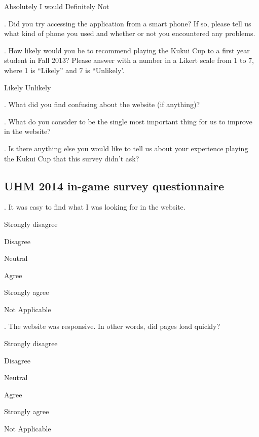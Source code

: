 \indent \indent Absolutely I would               \indent  Definitely Not

. Did you try accessing the application from a smart phone? If so, please tell us what kind of phone you used and whether or not you encountered any problems.

. How likely would you be to recommend playing the Kukui Cup to a first year student in Fall 2013?
Please answer with a number in a Likert scale from 1 to 7, where 1 is ``Likely'' and 7 is ``Unlikely'.

\indent \indent Likely               \indent  Unlikely

. What did you find confusing about the website (if anything)?

. What do you consider to be the single most important thing for us to improve in the website?

. Is there anything else you would like to tell us about your experience playing the Kukui Cup that
this survey didn't ask?

\subsection {UHM 2014 in-game survey questionnaire}

. It was easy to find what I was looking for in the website.
\begin{radiobutton}
	\item Strongly disagree
	\item Disagree
	\item Neutral
	\item Agree
	\item Strongly agree
	\item Not Applicable
\end{radiobutton}

. The website was responsive. In other words, did pages load quickly?
\begin{radiobutton}
	\item Strongly disagree
	\item Disagree
	\item Neutral
	\item Agree
	\item Strongly agree
	\item Not Applicable
\end{radiobutton}

